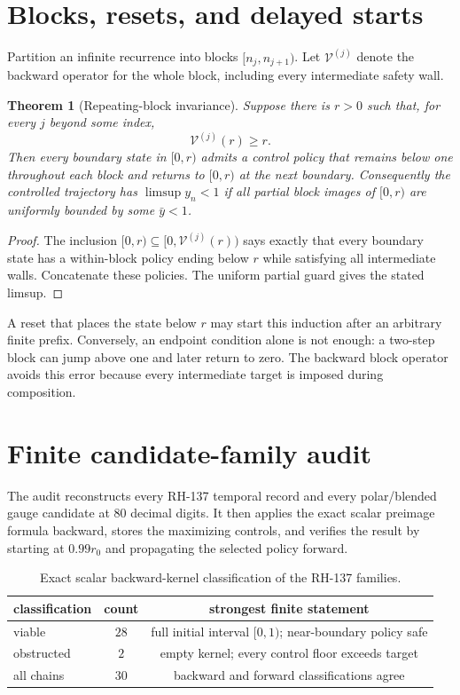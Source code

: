 \documentclass[12pt]{article}
\newtheorem{theorem}{Theorem}
\begin{document}
\section{Blocks, resets, and delayed starts}
Partition an infinite recurrence into blocks
$[n_j,n_{j+1})$.  Let $\mathcal V^{(j)}$ denote the backward operator for the
whole block, including every intermediate safety wall.

\begin{theorem}[Repeating-block invariance]\label{thm:block}
Suppose there is $r>0$ such that, for every $j$ beyond some index,
\[
 \mathcal V^{(j)}(r)\geq r.
\]
Then every boundary state in $[0,r)$ admits a control policy that remains
below one throughout each block and returns to $[0,r)$ at the next boundary.
Consequently the controlled trajectory has $\limsup y_n<1$ if all partial
block images of $[0,r)$ are uniformly bounded by some $\bar y<1$.
\end{theorem}
\begin{proof}
The inclusion $[0,r)\subseteq[0,\mathcal V^{(j)}(r))$ says exactly that every
boundary state has a within-block policy ending below $r$ while satisfying
all intermediate walls.  Concatenate these policies.  The uniform partial
guard gives the stated limsup.
\end{proof}

A reset that places the state below $r$ may start this induction after an
arbitrary finite prefix.  Conversely, an endpoint condition alone is not
enough: a two-step block can jump above one and later return to zero.  The
backward block operator avoids this error because every intermediate target
is imposed during composition.

\section{Finite candidate-family audit}
The audit reconstructs every RH-137 temporal record and every polar/blended
gauge candidate at 80 decimal digits.  It then applies the exact scalar
preimage formula backward, stores the maximizing controls, and verifies the
result by starting at $0.99r_0$ and propagating the selected policy forward.

\begin{table}[t]
\centering
\begin{tabular}{lcc}
\toprule
classification & count & strongest finite statement\\
\midrule
viable & $28$ & full initial interval $[0,1)$; near-boundary policy safe\\
obstructed & $2$ & empty kernel; every control floor exceeds target\\
all chains & $30$ & backward and forward classifications agree\\
\bottomrule
\end{tabular}
\caption{Exact scalar backward-kernel classification of the RH-137 families.}
\label{tab:audit}
\end{table}
\end{document}
